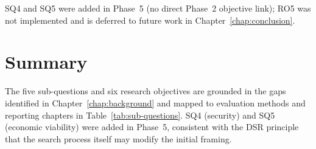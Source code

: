 SQ4 and SQ5 were added in Phase~5 (no direct Phase~2 objective link); RO5 was not implemented and is deferred to future work in Chapter~\ref{chap:conclusion}.

\section{Summary}\label{sec:chapter-3-summary}

The five sub-questions and six research objectives are grounded in the gaps identified in Chapter~\ref{chap:background} and mapped to evaluation methods and reporting chapters in Table~\ref{tab:sub-questions}. SQ4 (security) and SQ5 (economic viability) were added in Phase~5, consistent with the DSR principle that the search process itself may modify the initial framing.
